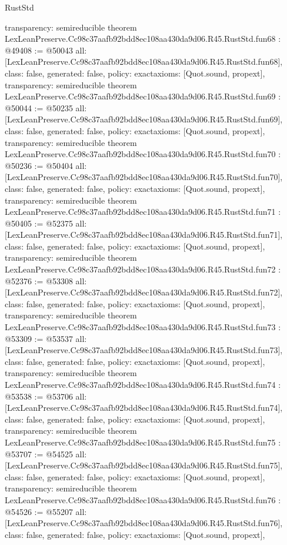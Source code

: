 \begin{lexlean}{RustStd}
\begin{coremodule}
{  transparency: semireducible
}
theorem LexLeanPreserve.Cc98c37aafb92bdd8ec108aa430da9d06.R45.RustStd.fun68 : @49408 := @50043 {
  all: [LexLeanPreserve.Cc98c37aafb92bdd8ec108aa430da9d06.R45.RustStd.fun68],
  class: false,
  generated: false,
  policy: exact{axioms: [Quot.sound, propext]},
  transparency: semireducible
}
theorem LexLeanPreserve.Cc98c37aafb92bdd8ec108aa430da9d06.R45.RustStd.fun69 : @50044 := @50235 {
  all: [LexLeanPreserve.Cc98c37aafb92bdd8ec108aa430da9d06.R45.RustStd.fun69],
  class: false,
  generated: false,
  policy: exact{axioms: [Quot.sound, propext]},
  transparency: semireducible
}
theorem LexLeanPreserve.Cc98c37aafb92bdd8ec108aa430da9d06.R45.RustStd.fun70 : @50236 := @50404 {
  all: [LexLeanPreserve.Cc98c37aafb92bdd8ec108aa430da9d06.R45.RustStd.fun70],
  class: false,
  generated: false,
  policy: exact{axioms: [Quot.sound, propext]},
  transparency: semireducible
}
theorem LexLeanPreserve.Cc98c37aafb92bdd8ec108aa430da9d06.R45.RustStd.fun71 : @50405 := @52375 {
  all: [LexLeanPreserve.Cc98c37aafb92bdd8ec108aa430da9d06.R45.RustStd.fun71],
  class: false,
  generated: false,
  policy: exact{axioms: [Quot.sound, propext]},
  transparency: semireducible
}
theorem LexLeanPreserve.Cc98c37aafb92bdd8ec108aa430da9d06.R45.RustStd.fun72 : @52376 := @53308 {
  all: [LexLeanPreserve.Cc98c37aafb92bdd8ec108aa430da9d06.R45.RustStd.fun72],
  class: false,
  generated: false,
  policy: exact{axioms: [Quot.sound, propext]},
  transparency: semireducible
}
theorem LexLeanPreserve.Cc98c37aafb92bdd8ec108aa430da9d06.R45.RustStd.fun73 : @53309 := @53537 {
  all: [LexLeanPreserve.Cc98c37aafb92bdd8ec108aa430da9d06.R45.RustStd.fun73],
  class: false,
  generated: false,
  policy: exact{axioms: [Quot.sound, propext]},
  transparency: semireducible
}
theorem LexLeanPreserve.Cc98c37aafb92bdd8ec108aa430da9d06.R45.RustStd.fun74 : @53538 := @53706 {
  all: [LexLeanPreserve.Cc98c37aafb92bdd8ec108aa430da9d06.R45.RustStd.fun74],
  class: false,
  generated: false,
  policy: exact{axioms: [Quot.sound, propext]},
  transparency: semireducible
}
theorem LexLeanPreserve.Cc98c37aafb92bdd8ec108aa430da9d06.R45.RustStd.fun75 : @53707 := @54525 {
  all: [LexLeanPreserve.Cc98c37aafb92bdd8ec108aa430da9d06.R45.RustStd.fun75],
  class: false,
  generated: false,
  policy: exact{axioms: [Quot.sound, propext]},
  transparency: semireducible
}
theorem LexLeanPreserve.Cc98c37aafb92bdd8ec108aa430da9d06.R45.RustStd.fun76 : @54526 := @55207 {
  all: [LexLeanPreserve.Cc98c37aafb92bdd8ec108aa430da9d06.R45.RustStd.fun76],
  class: false,
  generated: false,
  policy: exact{axioms: [Quot.sound, propext]},
}
\end{coremodule}
\end{lexlean}

